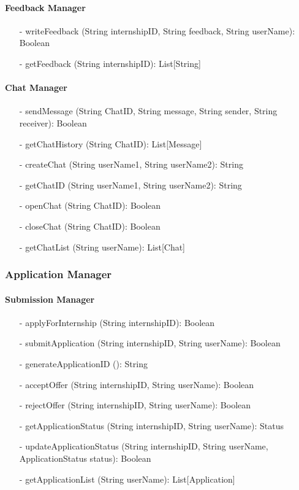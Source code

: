\paragraph{Feedback Manager}
\begin{itemize}
    \item[-] writeFeedback (String internshipID, String feedback, String userName): Boolean
    \item[-] getFeedback (String internshipID): List[String]
\end{itemize}

\paragraph{Chat Manager}
\begin{itemize}
    \item[-] sendMessage (String ChatID, String message, String sender, String receiver): Boolean
    \item[-] getChatHistory (String ChatID): List[Message]
    \item[-] createChat (String userName1, String userName2): String
    \item[-] getChatID (String userName1, String userName2): String
    \item[-] openChat (String ChatID): Boolean
    \item[-] closeChat (String ChatID): Boolean
    \item[-] getChatList (String userName): List[Chat]
\end{itemize}


\subsubsection{Application Manager}
\paragraph{Submission Manager}
\begin{itemize}
    \item[-] applyForInternship (String internshipID): Boolean
    \item[-] submitApplication (String internshipID, String userName): Boolean
    \item[-] generateApplicationID (): String
    \item[-] acceptOffer (String internshipID, String userName): Boolean
    \item[-] rejectOffer (String internshipID, String userName): Boolean
    \item[-] getApplicationStatus (String internshipID, String userName): Status
    \item[-] updateApplicationStatus (String internshipID, String userName, ApplicationStatus status): Boolean
    \item[-] getApplicationList (String userName): List[Application]
\end{itemize}

